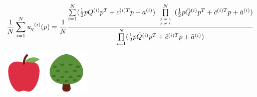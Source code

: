 \documentclass{beamer}
\begin{document}
\begin{frame}
    \begin{center}
    \begin{theorem}
    {\tiny
     \boldmath\[\frac{1}{N} \sum\limits_{i=1} ^ {N} {u_q}^{(i)} (p) = \frac{1}{N}
     \frac{\sum\limits_{i=1} ^ {N} (\frac{1}{2} pQ^{(i)} p^T + c^{(i)T} p + a^ {(i)})
     \prod\limits_{\tiny\begin{array}{l} j=1 \\ j \neq i \end{array}} ^ 
     N (\frac{1}{2} p\bar{Q}^{(i)} p^T + \bar{c}^{(i)T} p + \bar{a}^ {(i)})}
     {\prod\limits_{i=1} ^ N (\frac{1}{2} p\bar{Q}^{(i)} p^T + \bar{c}^{(i)T} p + \bar{a}^ {(i)})}\]}
    \end{theorem}
    \end{center}
\end{frame}

\begin{frame}
    \centering
    \includegraphics[width=.22\textwidth]{apple} \pause \hspace{2cm} 
    \includegraphics[width=.3\textwidth]{tree} 
\end{frame}

\begin{frame}
    \begin{center}
    
    \end{center}
\end{frame}

\begin{frame}
    \begin{center}
    
    \end{center}
\end{frame}
\end{document}
